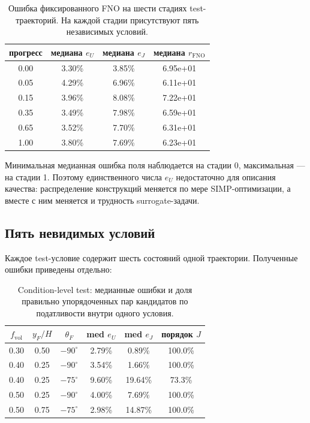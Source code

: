 \begin{table}[ht]
 \centering
 \small
 \begin{tabular}{c|c|c|c}
  прогресс & медиана $e_U$ & медиана $e_J$ & медиана $r_{\mathrm{FNO}}$\\
  \hline
  0.00 & 3.30\% & 3.85\% & 6.95e+01\\
  0.05 & 4.29\% & 6.96\% & 6.11e+01\\
  0.15 & 3.96\% & 8.08\% & 7.22e+01\\
  0.35 & 3.49\% & 7.98\% & 6.59e+01\\
  0.65 & 3.52\% & 7.70\% & 6.31e+01\\
  1.00 & 3.80\% & 7.69\% & 6.23e+01\\
 \end{tabular}
 \caption{Ошибка фиксированного FNO на шести стадиях test-траекторий. На каждой стадии присутствуют пять независимых условий.}
 \label{tab:practical-v06-stage-errors}
\end{table}

Минимальная медианная ошибка поля наблюдается на стадии 0, максимальная --- на стадии 1. Поэтому единственного числа $e_U$ недостаточно для описания качества: распределение конструкций меняется по мере SIMP-оптимизации, а вместе с ним меняется и трудность surrogate-задачи.

\subsection{Пять невидимых условий}
\label{subsec:practical-v06-condition-generalization}

Каждое test-условие содержит шесть состояний одной траектории. Полученные ошибки приведены отдельно:
\begin{table}[ht]
 \centering
 \small
 \begin{tabular}{c|c|c|c|c|c}
  $f_{\mathrm{vol}}$ & $y_F/H$ & $\theta_F$ & med $e_U$ & med $e_J$ & порядок $J$\\
  \hline
  0.30 & 0.50 & $-90^\circ$ & 2.79\% & 0.89\% & 100.0\%\\
  0.40 & 0.25 & $-90^\circ$ & 3.54\% & 1.66\% & 100.0\%\\
  0.40 & 0.25 & $-75^\circ$ & 9.60\% & 19.64\% & 73.3\%\\
  0.50 & 0.25 & $-90^\circ$ & 4.00\% & 7.69\% & 100.0\%\\
  0.50 & 0.75 & $-75^\circ$ & 2.98\% & 14.87\% & 100.0\%\\
 \end{tabular}
 \caption{Condition-level test: медианные ошибки и доля правильно упорядоченных пар кандидатов по податливости внутри одного условия.}
 \label{tab:practical-v06-condition-errors}
\end{table}

